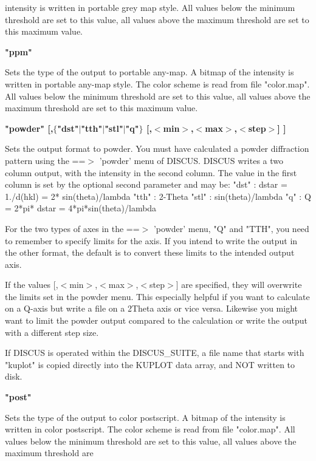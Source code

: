 intensity is written in portable grey map style. All values below the 
minimum threshold are set to this value, all values above the maximum 
threshold are set to this maximum value. 
\par
{\bf "ppm" \par }
\vspace{3pt}
Sets the type of the output to portable any-map. A bitmap of the 
intensity is written in portable any-map style. The color scheme 
is read from file "color.map". All values below the 
minimum threshold are set to this value, all values above the maximum 
threshold are set to this maximum value. 
\par
{\bf "powder" [,$ \{$"dst"$| $"tth"$| $"stl"$| $"q"$\} $ [,$ <$min$> $,$ <$max$> $,$ <$step$> $] ] \par }
\vspace{3pt}
Sets the output format to powder. You must have calculated a 
powder diffraction pattern using the ==$> $ 'powder' menu of DISCUS. 
DISCUS writes a two column output, with the intensity 
in the second column. The value in the first column is set by the 
optional second parameter and may be: 
"dst" : dstar = 1./d(hkl) = 2* sin(theta)/lambda 
"tth" : 2-Theta 
"stl" : sin(theta)/lambda 
"q"   : Q = 2*pi* dstar = 4*pi*sin(theta)/lambda 
\par
For the two types of axes in the ==$> $ 'powder' menu, "Q" and "TTH", 
you need to remember to specify limits for the axis. If you 
intend to write the output in the other format, the default is 
to convert these limits to the intended output axis. 
\par
If the values [,$ <$min$> $,$ <$max$> $,$ <$step$> $] are specified, they will 
overwrite the limits set in the powder menu. This especially 
helpful if you want to calculate on a Q-axis but write a file 
on a 2Theta axis or vice versa. Likewise you might want to 
limit the powder output compared to the calculation or write 
the output with a different step size. 
\par
If DISCUS is operated within the DISCUS\_SUITE, a file name 
that starts with "kuplot" is copied directly into the KUPLOT 
data array, and NOT written to disk. 
\par
{\bf "post" \par }
\vspace{3pt}
Sets the type of the output to color postscript. A bitmap of the 
intensity is written in color postscript. The color scheme is read 
from file "color.map". All values below the minimum threshold 
are set to this value, all values above the maximum threshold are 
